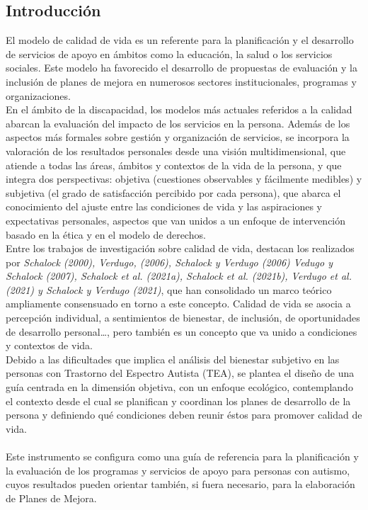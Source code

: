 \subsection{Introducción}
El modelo de calidad de vida es un referente para la planificación y el
desarrollo de servicios de apoyo en ámbitos como la educación, la salud o los
servicios sociales. Este modelo ha favorecido el desarrollo de propuestas de
evaluación y la inclusión de planes de mejora en numerosos sectores
institucionales, programas y organizaciones.  
\\ 
En el ámbito de la discapacidad, los modelos más actuales referidos a la calidad
abarcan la evaluación del impacto de los servicios en la persona. Además de los
aspectos más formales sobre gestión y organización de servicios, se incorpora la
valoración de los resultados personales desde una visión multidimensional, que
atiende a todas las áreas, ámbitos y contextos de la vida de la persona, y que
integra dos perspectivas: objetiva (cuestiones observables y fácilmente
medibles) y subjetiva (el grado de satisfacción percibido por cada persona), que
abarca el conocimiento del ajuste entre las condiciones de vida y las
aspiraciones y expectativas personales, aspectos que van unidos a un enfoque de
intervención basado en la ética y en el modelo de derechos. 
\\
Entre los trabajos de investigación sobre calidad de vida, destacan los
realizados por \textit{Schalock (2000), Verdugo, (2006), Schalock y Verdugo (2006)
Vedugo y Schalock (2007), Schalock et al. (2021a), Schalock et al. (2021b),
Verdugo et al. (2021) y Schalock y Verdugo (2021)}, que han consolidado un marco
teórico ampliamente consensuado en torno a este concepto. Calidad de vida se
asocia a percepción individual, a sentimientos de bienestar, de inclusión, de
oportunidades de desarrollo personal…, pero también es un concepto que va unido
a condiciones y contextos de vida. 
\\
Debido a las dificultades que implica el análisis del bienestar subjetivo en las
personas con Trastorno del Espectro Autista (TEA), se plantea el diseño de una
guía centrada en la dimensión objetiva, con un enfoque ecológico, contemplando
el contexto desde el cual se planifican y coordinan los planes de desarrollo de
la persona y definiendo qué condiciones deben reunir éstos para promover calidad
de vida.\\
\\
Este instrumento se configura como una guía de referencia para la planificación
y la evaluación de los programas y servicios de apoyo para personas con autismo,
cuyos resultados pueden orientar también, si fuera necesario, para la
elaboración de Planes de Mejora.
\\

